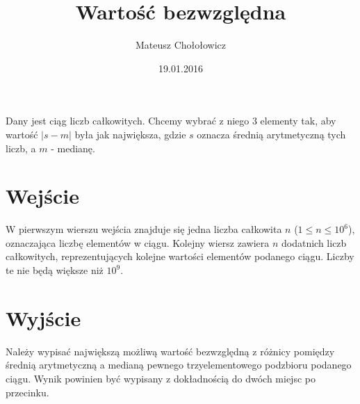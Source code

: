 \documentclass[zad,zawodnik,utf8]{sinol}
\title{Wartość bezwzględna}
\author{Mateusz Chołołowicz} %
\date{19.01.2016}
\begin{document}
  \begin{tasktext}%
Dany jest ciąg liczb całkowitych. Chcemy wybrać z niego 3 elementy tak, aby wartość $|s - m|$ była jak największa,
gdzie $s$ oznacza średnią arytmetyczną tych liczb, a $m$ - medianę.

 \section{Wejście}
    
W pierwszym wierszu wejścia znajduje się jedna liczba całkowita $n$ ($1 \leq n \leq 10^6$), oznaczająca 
liczbę elementów w ciągu. Kolejny wiersz zawiera $n$ dodatnich liczb całkowitych, reprezentujących kolejne wartości
elementów podanego ciągu. Liczby te nie będą większe niż $10^9$.

  \section{Wyjście}
    Należy wypisać największą możliwą wartość bezwzględną z różnicy pomiędzy średnią arytmetyczną a medianą 
    pewnego trzyelementowego podzbioru podanego ciągu. Wynik powinien być wypisany z dokładnością do dwóch
    miejsc po przecinku.
     \makecompactexample

  \end{tasktext}
\end{document}
